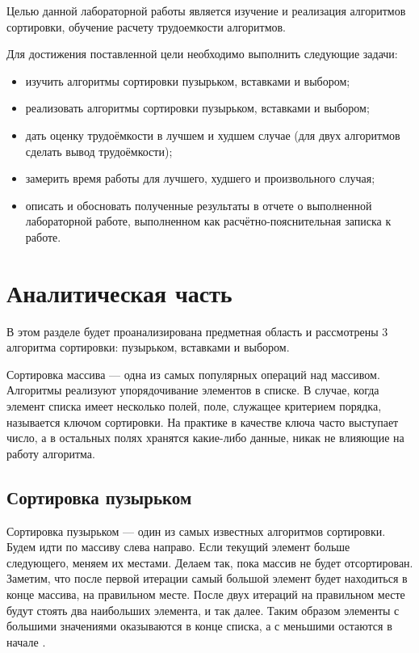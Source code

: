\documentclass[12pt]{report}
\begin{document}
	Целью данной лабораторной работы является изучение и реализация алгоритмов сортировки, обучение расчету трудоемкости алгоритмов.
	\newline
	
	Для достижения поставленной цели необходимо выполнить следующие задачи:
	\begin{itemize}
		\item изучить алгоритмы сортировки пузырьком, вставками и выбором;
		\item реализовать алгоритмы сортировки пузырьком, вставками и выбором;
		\item дать оценку трудоёмкости в лучшем и худшем случае (для двух алгоритмов сделать вывод трудоёмкости);
		\item замерить время работы для лучшего, худшего и произвольного случая;
		\item описать и обосновать полученные результаты в отчете о выполненной лабораторной работе, выполненном как расчётно-пояснительная записка к работе.
	\end{itemize}
	
	\chapter{Аналитическая часть}
	
	В этом разделе будет проанализирована предметная область и рассмотрены 3 алгоритма сортировки: пузырьком, вставками и выбором.
	\newline
	
	Сортировка массива — одна из самых популярных операций над массивом. Алгоритмы реализуют упорядочивание элементов в списке. В случае, когда элемент списка имеет несколько полей, поле, служащее критерием порядка, называется ключом сортировки. На практике в качестве ключа часто выступает число, а в остальных полях хранятся какие-либо данные, никак не влияющие на работу алгоритма. 
	
	\section{Сортировка пузырьком}
	
	Сортировка пузырьком — один из самых известных алгоритмов сортировки. Будем идти по массиву слева направо. Если текущий элемент больше следующего, меняем их местами. Делаем так, пока массив не будет отсортирован. Заметим, что после первой итерации самый большой элемент будет находиться в конце массива, на правильном месте. После двух итераций на правильном месте будут стоять два наибольших элемента, и так далее. Таким образом элементы с большими значениями оказываются в конце списка, а с меньшими остаются в начале \cite{bubble}.
	
\end{document}

